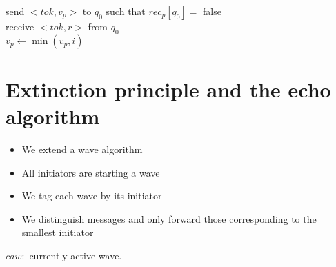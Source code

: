 \begin{algorithm}[H]
send $<tok, v_p>$ to $q_0$ such that $rec_p[q_0]=$ false\\
receive $<tok, r>$ from $q_0$\\
$v_p\leftarrow \min(v_p,i)$ 
\end{algorithm}


\section{Extinction principle and the echo algorithm}
\begin{itemize}
\item We extend a wave algorithm
\item All initiators are starting a wave
\item We tag each wave by its initiator
\item We distinguish messages and only forward those corresponding to the smallest initiator
\end{itemize}


$caw:$ currently active wave.

